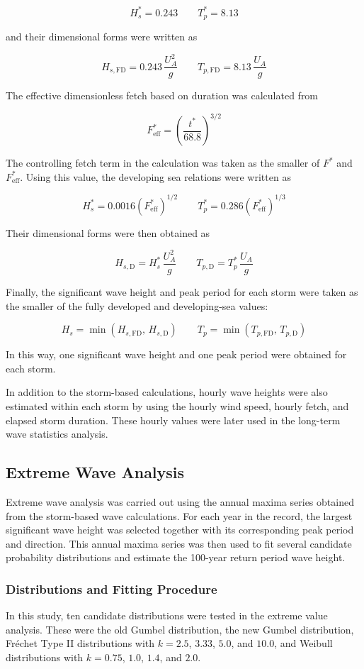 \documentclass[a4paper, 11pt]{article}
\begin{document}
\[
H_s^* = 0.243
\qquad
T_p^* = 8.13
\]

and their dimensional forms were written as

\[
H_{s,\mathrm{FD}} = 0.243\,\frac{U_A^2}{g}
\qquad
T_{p,\mathrm{FD}} = 8.13\,\frac{U_A}{g}
\]

The effective dimensionless fetch based on duration was calculated from

\[
F^*_{\mathrm{eff}}=\left(\frac{t^*}{68.8}\right)^{3/2}
\]

The controlling fetch term in the calculation was taken as the smaller of \(F^*\) and \(F^*_{\mathrm{eff}}\). Using this value, the developing sea relations were written as

\[
H_s^* = 0.0016\left(F^*_{\mathrm{eff}}\right)^{1/2}
\qquad
T_p^* = 0.286\left(F^*_{\mathrm{eff}}\right)^{1/3}
\]

Their dimensional forms were then obtained as

\[
H_{s,\mathrm{D}} = H_s^*\,\frac{U_A^2}{g}
\qquad
T_{p,\mathrm{D}} = T_p^*\,\frac{U_A}{g}
\]

Finally, the significant wave height and peak period for each storm were taken as the smaller of the fully developed and developing-sea values:

\[
H_s = \min\left(H_{s,\mathrm{FD}},\,H_{s,\mathrm{D}}\right)
\qquad
T_p = \min\left(T_{p,\mathrm{FD}},\,T_{p,\mathrm{D}}\right)
\]

In this way, one significant wave height and one peak period were obtained for each storm.

In addition to the storm-based calculations, hourly wave heights were also estimated within each storm by using the hourly wind speed, hourly fetch, and elapsed storm duration. These hourly values were later used in the long-term wave statistics analysis.

\subsection{Extreme Wave Analysis}
\hspace*{0.5cm}Extreme wave analysis was carried out using the annual maxima series obtained from the storm-based wave calculations. For each year in the record, the largest significant wave height was selected together with its corresponding peak period and direction. This annual maxima series was then used to fit several candidate probability distributions and estimate the 100-year return period wave height.

\subsubsection{Distributions and Fitting Procedure}
In this study, ten candidate distributions were tested in the extreme value analysis. These were the old Gumbel distribution, the new Gumbel distribution, Fr\'echet Type II distributions with \(k=2.5\), \(3.33\), \(5.0\), and \(10.0\), and Weibull distributions with \(k=0.75\), \(1.0\), \(1.4\), and \(2.0\).
\end{document}
